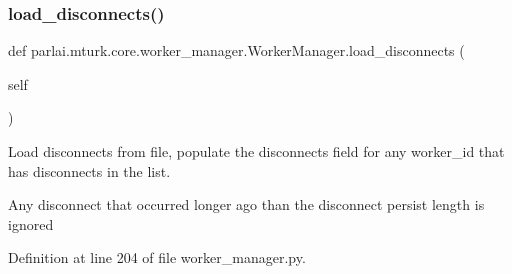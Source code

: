 \mbox{\label{classparlai_1_1mturk_1_1core_1_1worker__manager_1_1WorkerManager_aac0a3b7f87f3f60035cbb35155ea480d}} 
\subsubsection{\texorpdfstring{load\+\_\+disconnects()}{load\_disconnects()}}
{\footnotesize\ttfamily def parlai.\+mturk.\+core.\+worker\+\_\+manager.\+Worker\+Manager.\+load\+\_\+disconnects (\begin{DoxyParamCaption}\item[{}]{self }\end{DoxyParamCaption})}

\begin{DoxyVerb}Load disconnects from file, populate the disconnects field for any worker_id
that has disconnects in the list.

Any disconnect that occurred longer ago than the disconnect persist length is
ignored
\end{DoxyVerb}
 

Definition at line 204 of file worker\+\_\+manager.\+py.


